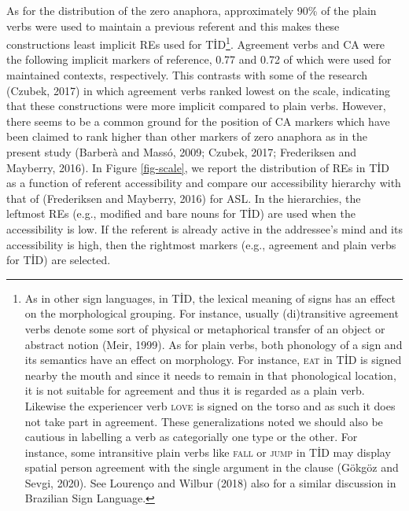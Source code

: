 \documentclass[]{elsarticle} %
\begin{document}
As for the distribution of the zero anaphora, approximately 90\% of the
plain verbs were used to maintain a previous referent and this makes
these constructions least implicit REs used for TİD\footnote{As in other
  sign languages, in TİD, the lexical meaning of signs has an effect on
  the morphological grouping. For instance, usually (di)transitive
  agreement verbs denote some sort of physical or metaphorical transfer
  of an object or abstract notion (Meir, 1999). As for plain verbs, both
  phonology of a sign and its semantics have an effect on morphology.
  For instance, \textsc{eat} in TİD is signed nearby the mouth and since
  it needs to remain in that phonological location, it is not suitable
  for agreement and thus it is regarded as a plain verb. Likewise the
  experiencer verb \textsc{love} is signed on the torso and as such it
  does not take part in agreement. These generalizations noted we should
  also be cautious in labelling a verb as categorially one type or the
  other. For instance, some intransitive plain verbs like \textsc{fall}
  or \textsc{jump} in TİD may display spatial person agreement with the
  single argument in the clause (Gökgöz and Sevgi, 2020). See Lourenço
  and Wilbur (2018) also for a similar discussion in Brazilian Sign
  Language.}. Agreement verbs and CA were the following implicit markers
of reference, 0.77 and 0.72 of which were used for maintained contexts,
respectively. This contrasts with some of the research (Czubek, 2017) in
which agreement verbs ranked lowest on the scale, indicating that these
constructions were more implicit compared to plain verbs. However, there
seems to be a common ground for the position of CA markers which have
been claimed to rank higher than other markers of zero anaphora as in
the present study (Barberà and Massó, 2009; Czubek, 2017; Frederiksen
and Mayberry, 2016). In Figure \ref{fig-scale}, we report the
distribution of REs in TİD as a function of referent accessibility and
compare our accessibility hierarchy with that of (Frederiksen and
Mayberry, 2016) for ASL. In the hierarchies, the leftmost REs (e.g.,
modified and bare nouns for TİD) are used when the accessibility is low.
If the referent is already active in the addressee's mind and its
accessibility is high, then the rightmost markers (e.g., agreement and
plain verbs for TİD) are selected.
\end{document}
